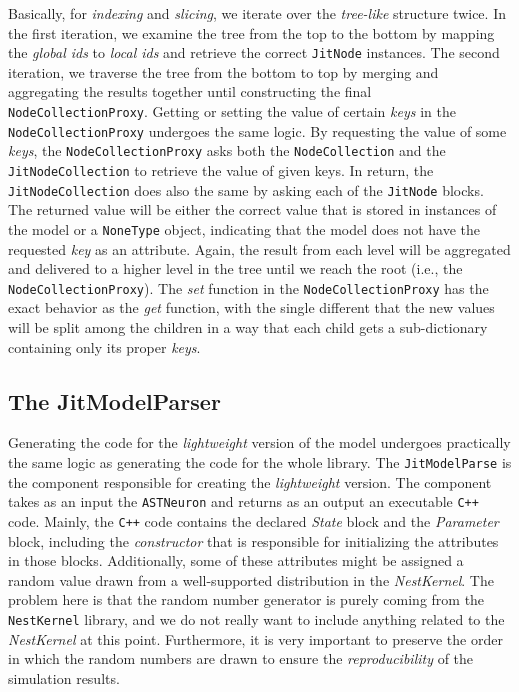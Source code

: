 Basically, for \emph{indexing} and \emph{slicing}, we iterate over the \emph{tree-like} structure twice. In the first iteration, we examine the tree from the top to the bottom by mapping the \emph{global ids} to \emph{local ids} and retrieve the correct \texttt{JitNode} instances. The second iteration, we traverse the tree from the bottom to top by merging and aggregating the results together until constructing the final \texttt{NodeCollectionProxy}. Getting or setting the value of certain \emph{keys} in the \texttt{NodeCollectionProxy} undergoes the same logic. By requesting the value of some \emph{keys}, the \texttt{NodeCollectionProxy} asks both the \texttt{NodeCollection} and the \texttt{JitNodeCollection} to retrieve the value of given keys. In return, the \texttt{JitNodeCollection} does also the same by asking each of the \texttt{JitNode} blocks. The returned value will be either the correct value that is stored in instances of the model or a \texttt{NoneType} object, indicating that the model does not have the requested \emph{key} as an attribute. Again, the result from each level will be aggregated and delivered to a higher level in the tree until we reach the root (i.e., the \texttt{NodeCollectionProxy}). The \emph{set} function in the \texttt{NodeCollectionProxy} has the exact behavior as the \emph{get} function, with the single different that the new values will be split among the children in a way that  each child gets a sub-dictionary containing only its proper \emph{keys}.

\subsection{The JitModelParser}

Generating the code for the \emph{lightweight} version of the model undergoes practically the same logic as generating the code for the whole library.  The \texttt{JitModelParse} is the component responsible for creating the \emph{lightweight} version. The component takes as an input the \texttt{ASTNeuron} and returns as an output an executable \texttt{C++} code. Mainly, the \texttt{C++} code contains the declared \emph{State} block and the \emph{Parameter} block, including the \emph{constructor} that is responsible for initializing the attributes in those blocks. Additionally, some of these attributes might  be assigned a random value drawn from a well-supported distribution in the \emph{NestKernel}. The problem here is that the random number generator is purely coming from the \texttt{NestKernel} library, and we do not really want to include anything related to the \emph{NestKernel} at this point. Furthermore, it is very important to preserve the order in which the random numbers are drawn to ensure the \emph{reproducibility} of the simulation results.

